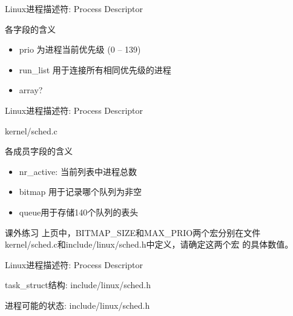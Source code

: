 \documentclass[xcolor=svgnames]{beamer}
\begin{document}
\begin{CJK*}{UTF8}{gbsn}
\begin{frame}{Linux进程描述符: Process Descriptor}
\lstrunning
\begin{block}{各字段的含义}
\begin{itemize}
\item prio 为进程当前优先级 (0 -- 139)
\item run\_list 用于连接所有相同优先级的进程
\item array?
\end{itemize}
\end{block}
\end{frame}

\begin{frame}{Linux进程描述符: Process Descriptor}
\begin{block}{kernel/sched.c}
\lstprio
\end{block}
\begin{block}{各成员字段的含义}
\begin{itemize}
\item nr\_active: 当前列表中进程总数
\item bitmap 用于记录哪个队列为非空
\item queue用于存储140个队列的表头
\end{itemize}
\end{block}
\end{frame}

\begin{frame}{课外练习}
上页中，\alert{BITMAP\_SIZE}和\alert{MAX\_PRIO}两个宏分别在文件kernel/sched.c和include/linux/sched.h中定义，请确定这两个宏
的具体数值。
\end{frame}

\begin{frame}{Linux进程描述符: Process Descriptor}
\begin{block}{task\_struct结构: include/linux/sched.h}
\lstPCBstate
\end{block}
\begin{block}{进程可能的状态: include/linux/sched.h}
\lststates
\end{block}
\end{frame}


\end{CJK*}
\end{document}
